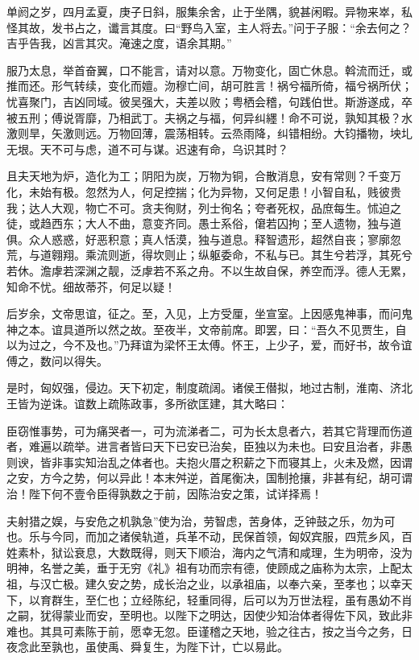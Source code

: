\documentclass[]{article}
\begin{document}
单阏之岁，四月孟夏，庚子日斜，服集余舍，止于坐隅，貌甚闲暇。异物来崒，私怪其故，发书占之，谶言其度。曰``野鸟入室，主人将去。''问于子服：``余去何之？吉乎告我，凶言其灾。淹速之度，语余其期。''

服乃太息，举首奋翼，口不能言，请对以意。万物变化，固亡休息。斡流而迁，或推而还。形气转续，变化而嬗。沕穆亡间，胡可胜言！祸兮福所倚，福兮祸所伏；忧喜聚门，吉凶同域。彼吴强大，夫差以败；粤栖会稽，句践伯世。斯游遂成，卒被五刑；傅说胥靡，乃相武丁。夫祸之与福，何异纠纆！命不可说，孰知其极？水激则旱，矢激则远。万物回薄，震荡相转。云烝雨降，纠错相纷。大钧播物，坱圠无垠。天不可与虑，道不可与谋。迟速有命，乌识其时？

且夫天地为炉，造化为工；阴阳为炭，万物为铜，合散消息，安有常则？千变万化，未始有极。忽然为人，何足控揣；化为异物，又何足患！小智自私，贱彼贵我；达人大观，物亡不可。贪夫徇财，列士徇名；夸者死权，品庶每生。怵迫之徒，或趋西东；大人不曲，意变齐同。愚士系俗，僒若囚拘；至人遗物，独与道俱。众人惑惑，好恶积意；真人恬漠，独与道息。释智遗形，超然自丧；寥廓忽荒，与道翱翔。乘流则逝，得坎则止；纵躯委命，不私与已。其生兮若浮，其死兮若休。澹虖若深渊之靓，泛虖若不系之舟。不以生故自保，养空而浮。德人无累，知命不忧。细故蒂芥，何足以疑！

后岁余，文帝思谊，征之。至，入见，上方受厘，坐宣室。上因感鬼神事，而问鬼神之本。谊具道所以然之故。至夜半，文帝前席。即罢，曰：``吾久不见贾生，自以为过之，今不及也。''乃拜谊为梁怀王太傅。怀王，上少子，爱，而好书，故令谊傅之，数问以得失。

是时，匈奴强，侵边。天下初定，制度疏阔。诸侯王僣拟，地过古制，淮南、济北王皆为逆诛。谊数上疏陈政事，多所欲匡建，其大略曰：

臣窃惟事势，可为痛哭者一，可为流涕者二，可为长太息者六，若其它背理而伤道者，难遍以疏举。进言者皆曰天下已安已治矣，臣独以为未也。曰安且治者，非愚则谀，皆非事实知治乱之体者也。夫抱火厝之积薪之下而寝其上，火未及燃，因谓之安，方今之势，何以异此！本末舛逆，首尾衡决，国制抢攘，非甚有纪，胡可谓治！陛下何不壹令臣得孰数之于前，因陈治安之策，试详择焉！

夫射猎之娱，与安危之机孰急''使为治，劳智虑，苦身体，乏钟鼓之乐，勿为可也。乐与今同，而加之诸侯轨道，兵革不动，民保首领，匈奴宾服，四荒乡风，百姓素朴，狱讼衰息，大数既得，则天下顺治，海内之气清和咸理，生为明帝，没为明神，名誉之美，垂于无穷《礼》祖有功而宗有德，使顾成之庙称为太宗，上配太祖，与汉亡极。建久安之势，成长治之业，以承祖庙，以奉六亲，至孝也；以幸天下，以育群生，至仁也；立经陈纪，轻重同得，后可以为万世法程，虽有愚幼不肖之嗣，犹得蒙业而安，至明也。以陛下之明达，因使少知治体者得佐下风，致此非难也。其具可素陈于前，愿幸无忽。臣谨稽之天地，验之往古，按之当今之务，日夜念此至孰也，虽使禹、舜复生，为陛下计，亡以易此。
\end{document}
